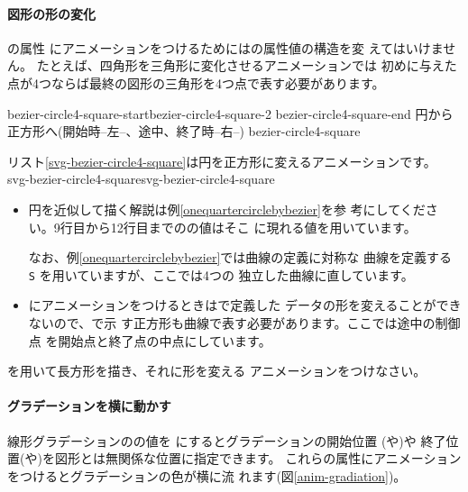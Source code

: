 \paragraph{図形の形の変化}の属性
にアニメーションをつけるためにはの属性値の構造を変
えてはいけません。
たとえば、四角形を三角形に変化させるアニメーションでは
初めに与えた点が4つならば最終の図形の三角形を4つ点で表す必要があります。

{{bezier-circle4-square-start}{bezier-circle4-square-2}%
{bezier-circle4-square-end}}
{円から正方形へ(開始時--左--、途中、終了時--右--)}
{bezier-circle4-square} 

リスト\ref{svg-bezier-circle4-square}は円を正方形に変えるアニメーションです。
%
{svg-bezier-circle4-square}{svg-bezier-circle4-square}
\begin{itemize}
 \item 円を近似して描く解説は例\ref{onequartercirclebybezier}を参
       考にしてください。9行目から12行目までのの値はそこ
       に現れる値を用いています。

       なお、例\ref{onequartercirclebybezier}では曲線の定義に対称な
       \Bezier 曲線を定義する \texttt{S} を用いていますが、ここでは4つの
       独立した\Bezier 曲線に直しています。
 \item {}にアニメーションをつけるときはで定義した
       データの形を変えることができないので、で示
       す正方形も\Bezier 曲線で表す必要があります。ここでは途中の制御点
       を開始点と終了点の中点にしています。
\end{itemize}
\begin{Problem}
 を用いて長方形を描き、それに形を変える
 アニメーションをつけなさい。
\end{Problem}

\paragraph{グラデーションを横に動かす}
線形グラデーションのの値を
にするとグラデーションの開始位置
(や)や
終了位置(や)を図形とは無関係な位置に指定できます。
これらの属性にアニメーションをつけるとグラデーションの色が横に流
れます(図\ref{anim-gradiation})。

